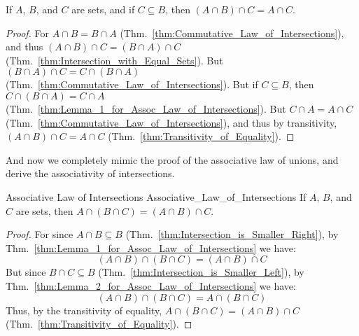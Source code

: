         \begin{theorem}
            \label{thm:Lemma_2_for_Assoc_Law_of_Intersections}%
            If $A$, $B$, and $C$ are sets, and if $C\subseteq{B}$, then
            $(A\cap{B})\cap{C}=A\cap{C}$.
        \end{theorem}
        \begin{proof}
            For $A\cap{B}=B\cap{A}$
            (Thm.~\ref{thm:Commutative_Law_of_Intersections}), and thus
            $(A\cap{B})\cap{C}=(B\cap{A})\cap{C}$
            (Thm.~\ref{thm:Intersection_with_Equal_Sets}). But
            $(B\cap{A})\cap{C}=C\cap(B\cap{A})$
            (Thm.~\ref{thm:Commutative_Law_of_Intersections}). But if
            $C\subseteq{B}$, then $C\cap(B\cap{A})=C\cap{A}$
            (Thm.~\ref{thm:Lemma_1_for_Assoc_Law_of_Intersections}). But
            $C\cap{A}=A\cap{C}$
            (Thm.~\ref{thm:Commutative_Law_of_Intersections}), and thus by
            transitivity, $(A\cap{B})\cap{C}=A\cap{C}$
            (Thm.~\ref{thm:Transitivity_of_Equality}).
        \end{proof}
        And now we completely mimic the proof of the associative law of unions,
        and derive the associativity of intersections.
        \begin{ltheorem}{Associative Law of Intersections}
                        {Associative_Law_of_Intersections}
            If $A$, $B$, and $C$ are sets, then
            $A\cap(B\cap{C})=(A\cap{B})\cap{C}$.
        \end{ltheorem}
        \begin{proof}
            For since $A\cap{B}\subseteq{B}$
            (Thm.~\ref{thm:Intersection_is_Smaller_Right}), by
            Thm.~\ref{thm:Lemma_1_for_Assoc_Law_of_Intersections} we have:
            \begin{equation}
                (A\cap{B})\cap(B\cap{C})=(A\cap{B})\cap{C}
            \end{equation}
            But since $B\cap{C}\subseteq{B}$
            (Thm.~\ref{thm:Intersection_is_Smaller_Left}),
            by Thm.~\ref{thm:Lemma_2_for_Assoc_Law_of_Intersections} we have:
            \begin{equation}
                (A\cap{B})\cap(B\cap{C})=A\cap(B\cap{C})
            \end{equation}
            Thus, by the transitivity of equality,
            $A\cap(B\cap{C})=(A\cap{B})\cap{C}$
            (Thm.~\ref{thm:Transitivity_of_Equality}).
        \end{proof}
